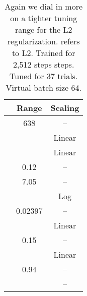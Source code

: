\documentclass{article}
\begin{document}
\begin{table}[t]
\centering
\setlength{\extrarowheight}{3.5pt}
\begin{tabular}{|c|c|c|}
\hline
 & Range & Scaling \\ \hline
 & 638 & -- \\ \hline
 &  & Linear \\ \hline
 &  & Linear \\ \hline
 & 0.12 & -- \\ \hline
 & 7.05 & -- \\ \hline
 &  & Log \\ \hline
 &  0.02397 & -- \\ \hline
 &  & Linear \\ \hline
 & 0.15 & -- \\ \hline
 &  & Linear \\ \hline
 & 0.94 & -- \\ \hline
 &  & -- \\ \hline
\end{tabular}
\caption{Again we dial in more on a tighter tuning range for the L2 regularization.  refers to L2. Trained for 2,512 steps steps. Tuned for 37 trials. Virtual batch size 64.}
\end{table}
 
\end{document}
